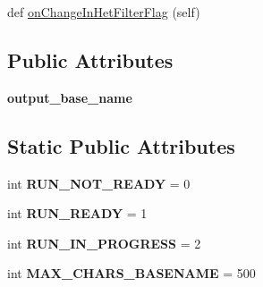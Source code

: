 \begin{DoxyCompactItemize}
\item 
def \hyperlink{classnegui_1_1pgguisimupop__experimental2_1_1PGGuiSimuPop_a76734c3af2d1be37b20ba4fcbf0a4908}{on\+Change\+In\+Het\+Filter\+Flag} (self)
\end{DoxyCompactItemize}
\subsection*{Public Attributes}
\begin{DoxyCompactItemize}
\item 
{\bfseries output\+\_\+base\+\_\+name}\hypertarget{classnegui_1_1pgguisimupop__experimental2_1_1PGGuiSimuPop_a85fd2199bf4221f68dabf446d33027b9}{}\label{classnegui_1_1pgguisimupop__experimental2_1_1PGGuiSimuPop_a85fd2199bf4221f68dabf446d33027b9}

\end{DoxyCompactItemize}
\subsection*{Static Public Attributes}
\begin{DoxyCompactItemize}
\item 
int {\bfseries R\+U\+N\+\_\+\+N\+O\+T\+\_\+\+R\+E\+A\+DY} = 0\hypertarget{classnegui_1_1pgguisimupop__experimental2_1_1PGGuiSimuPop_a7ef43e1182b1ac812c6edfb6cc3379d9}{}\label{classnegui_1_1pgguisimupop__experimental2_1_1PGGuiSimuPop_a7ef43e1182b1ac812c6edfb6cc3379d9}

\item 
int {\bfseries R\+U\+N\+\_\+\+R\+E\+A\+DY} = 1\hypertarget{classnegui_1_1pgguisimupop__experimental2_1_1PGGuiSimuPop_a96f37961248d5591de95fdae7888bcb1}{}\label{classnegui_1_1pgguisimupop__experimental2_1_1PGGuiSimuPop_a96f37961248d5591de95fdae7888bcb1}

\item 
int {\bfseries R\+U\+N\+\_\+\+I\+N\+\_\+\+P\+R\+O\+G\+R\+E\+SS} = 2\hypertarget{classnegui_1_1pgguisimupop__experimental2_1_1PGGuiSimuPop_a985953457461fd8e518f8e451dafe61d}{}\label{classnegui_1_1pgguisimupop__experimental2_1_1PGGuiSimuPop_a985953457461fd8e518f8e451dafe61d}

\item 
int {\bfseries M\+A\+X\+\_\+\+C\+H\+A\+R\+S\+\_\+\+B\+A\+S\+E\+N\+A\+ME} = 500\hypertarget{classnegui_1_1pgguisimupop__experimental2_1_1PGGuiSimuPop_aecacb1ee06910540866e31bc51ba9849}{}\label{classnegui_1_1pgguisimupop__experimental2_1_1PGGuiSimuPop_aecacb1ee06910540866e31bc51ba9849}

\end{DoxyCompactItemize}


